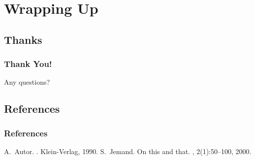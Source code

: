 \documentclass{beamer}
\begin{document}
  \section{Wrapping Up}
    \subsection{Thanks}
      \begin{frame}
        \frametitle{Thank You!}
        Any questions?
      \end{frame}
    \subsection{References}
      \begin{frame}[allowframebreaks]
        \frametitle{References}
        \begin{thebibliography}{10}
          \beamertemplatebookbibitems
              A.~Autor.
              .
              \newblock Klein-Verlag, 1990.
          \beamertemplatearticlebibitems
              S.~Jemand.
              \newblock On this and that.
              , 2(1):50--100, 2000.
        \end{thebibliography}
      \end{frame}
\end{document}
